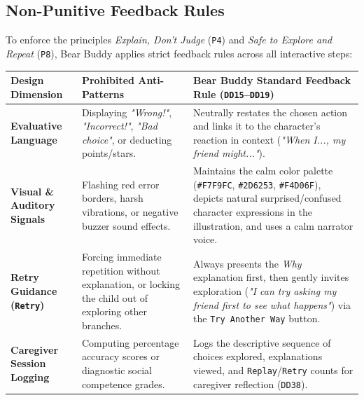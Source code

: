 \subsection{Non-Punitive Feedback Rules}


To enforce the principles \textit{Explain, Don't Judge} (\texttt{P4}) and \textit{Safe to Explore and Repeat} (\texttt{P8}), Bear Buddy applies strict feedback rules across all interactive steps:

\noindent\begin{xltabular}{\textwidth}{|p{3.2cm}|p{4.0cm}|X|}
\hline
\textbf{Design Dimension} & \textbf{Prohibited Anti-Patterns} & \textbf{Bear Buddy Standard Feedback Rule (\texttt{DD15}–\texttt{DD19})} \\ \hline
\endhead
\textbf{Evaluative Language} & Displaying \textit{"Wrong!"}, \textit{"Incorrect!"}, \textit{"Bad choice"}, or deducting points/stars. & Neutrally restates the chosen action and links it to the character's reaction in context (\textit{"When I..., my friend might..."}). \\ \hline
\textbf{Visual \& Auditory Signals} & Flashing red error borders, harsh vibrations, or negative buzzer sound effects. & Maintains the calm color palette (\texttt{\#F7F9FC}, \texttt{\#2D6253}, \texttt{\#F4D06F}), depicts natural surprised/confused character expressions in the illustration, and uses a calm narrator voice. \\ \hline
\textbf{Retry Guidance (\texttt{Retry})} & Forcing immediate repetition without explanation, or locking the child out of exploring other branches. & Always presents the \textit{Why} explanation first, then gently invites exploration (\textit{"I can try asking my friend first to see what happens"}) via the \texttt{Try Another Way} button. \\ \hline
\textbf{Caregiver Session Logging} & Computing percentage accuracy scores or diagnostic social competence grades. & Logs the descriptive sequence of choices explored, explanations viewed, and \texttt{Replay}/\texttt{Retry} counts for caregiver reflection (\texttt{DD38}). \\ \hline
\end{xltabular}

